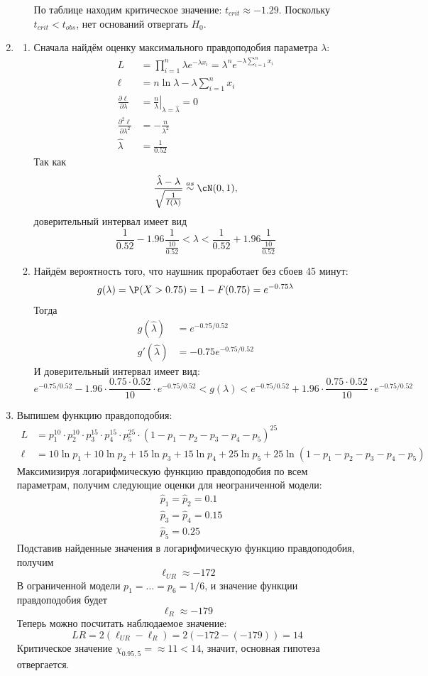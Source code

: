 \begin{enumerate}
\begin{enumerate}
\[\]
По таблице находим критическое значение: $t_{crit} \approx -1.29$.
Поскольку $t_{crit} < t_{obs}$, нет оснований отвергать $H_0$.
\end{enumerate}
\item
\begin{enumerate}
\item Сначала найдём оценку максимального правдоподобия параметра $\lambda$:
\begin{align*}
L &= \prod_{i=1}^n \lambda e^{-\lambda x_i} = \lambda^n e^{-\lambda \sum_{i=1}^n x_i} \\
\ell &= n \ln \lambda - \lambda \sum_{i=1}^n x_i \\
\frac{\partial \ell}{\partial \lambda} &= \left. \frac{n}{\lambda} \right|_{\lambda = \hat \lambda} = 0 \\
\frac{\partial^2 \ell}{\partial \lambda^2} &= -\frac{n}{\lambda^2} \\
\hat \lambda &= \frac{1}{0.52}
\end{align*}
Так как
\[
\frac{\hat \lambda - \lambda}{\sqrt{\frac{1}{I(\lambda)}}} \stackrel{as}{\sim} \cN(0,1),
\]
доверительный интервал имеет вид
\[
\frac{1}{0.52} - 1.96 \frac{1}{\frac{10}{0.52}} < \lambda < \frac{1}{0.52} + 1.96 \frac{1}{\frac{10}{0.52}}
\]
\item Найдём вероятность того, что наушник проработает без сбоев 45 минут:
\[
g(\lambda) = \P(X > 0.75) = 1 - F(0.75) = e^{-0.75\lambda}
\]
Тогда
\begin{align*}
g(\hat \lambda) &= e^{-0.75 / 0.52} \\
g'(\hat \lambda) &= -0.75 e^{-0.75 / 0.52}
\end{align*}
И доверительный интервал имеет вид:
\[
e^{-0.75 / 0.52} - 1.96 \cdot \frac{0.75 \cdot 0.52}{10} \cdot e^{-0.75 / 0.52} < g(\lambda) < e^{-0.75 / 0.52} + 1.96 \cdot \frac{0.75 \cdot 0.52}{10} \cdot e^{-0.75 / 0.52}
\]
\end{enumerate}
\item Выпишем функцию правдоподобия:
\begin{align*}
L &= p_1^{10} \cdot p_2^{10} \cdot p_3^{15} \cdot p_4^{15} \cdot p_5^{25} \cdot (1 - p_1 - p_2 - p_3 - p_4 - p_5)^{25} \\
\ell &= 10 \ln p_1 + 10 \ln p_2 + 15 \ln p_3 + 15 \ln p_4 + 25 \ln p_5 + 25 \ln (1 - p_1 - p_2 - p_3 - p_4 - p_5)
\end{align*}
Максимизируя логарифмическую функцию правдоподобия по всем параметрам,
получим следующие оценки для неограниченной модели:
\begin{align*}
& \hat p_1 = \hat p_2 = 0.1 \\
& \hat p_3 = \hat p_4 = 0.15 \\
& \hat p_5 = 0.25
\end{align*}
Подставив найденные значения в логарифмическую функцию правдоподобия, получим
\[
\ell_{UR} \approx -172
\]
В ограниченной модели $p_1 = \ldots = p_6 = 1/6$, и значение функции правдоподобия
будет
\[
\ell_R \approx -179
\]
Теперь можно посчитать наблюдаемое значение:
\[
LR = 2(\ell_{UR} - \ell_R) = 2(-172 - (-179)) = 14
\]
Критическое значение $\chi_{0.95, 5} = \approx 11 < 14$, значит, основная гипотеза
отвергается.
\end{enumerate}
